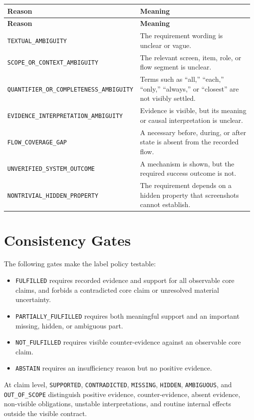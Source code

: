 \begin{longtable}{@{}>{\raggedright\arraybackslash}p{}>{\raggedright\arraybackslash}p{}@{}}
  \toprule
  \textbf{Reason} & \textbf{Meaning} \\
  \midrule
  \endfirsthead
  \toprule
  \textbf{Reason} & \textbf{Meaning} \\
  \midrule
  \endhead
  \texttt{TEXTUAL\_AMBIGUITY} & The requirement wording is unclear or vague. \\
  \texttt{SCOPE\_OR\_CONTEXT\_\allowbreak AMBIGUITY} & The relevant screen, item, role, or flow segment is unclear. \\
  \texttt{QUANTIFIER\_OR\_\allowbreak COMPLETENESS\_\allowbreak AMBIGUITY} & Terms such as ``all,'' ``each,'' ``only,'' ``always,'' or ``closest'' are not visibly settled. \\
  \texttt{EVIDENCE\_\allowbreak INTERPRETATION\_\allowbreak AMBIGUITY} & Evidence is visible, but its meaning or causal interpretation is unclear. \\
  \texttt{FLOW\_COVERAGE\_GAP} & A necessary before, during, or after state is absent from the recorded flow. \\
  \texttt{UNVERIFIED\_SYSTEM\_\allowbreak OUTCOME} & A mechanism is shown, but the required success outcome is not. \\
  \texttt{NONTRIVIAL\_HIDDEN\_\allowbreak PROPERTY} & The requirement depends on a hidden property that screenshots cannot establish. \\
  \bottomrule
\end{longtable}

\section{Consistency Gates}

The following gates make the label policy testable:

\begin{itemize}
  \item \texttt{FULFILLED} requires recorded evidence and support for all
    observable core claims, and forbids a contradicted core claim or unresolved
    material uncertainty.
  \item \texttt{PARTIALLY\_FULFILLED} requires both meaningful support and an
    important missing, hidden, or ambiguous part.
  \item \texttt{NOT\_FULFILLED} requires visible counter-evidence against an
    observable core claim.
  \item \texttt{ABSTAIN} requires an insufficiency reason but no positive
    evidence.
\end{itemize}

At claim level, \texttt{SUPPORTED}, \texttt{CONTRADICTED}, \texttt{MISSING},
\texttt{HIDDEN}, \texttt{AMBIGUOUS}, and \texttt{OUT\_OF\_SCOPE} distinguish
positive evidence, counter-evidence, absent evidence, non-visible obligations,
unstable interpretations, and routine internal effects outside the visible
contract.
